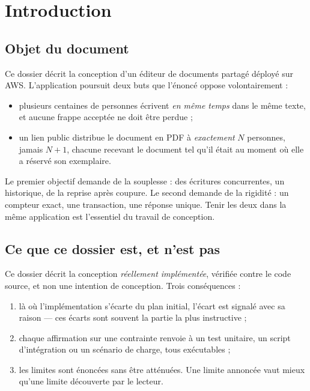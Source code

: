 \section{Introduction}

\subsection{Objet du document}

Ce dossier décrit la conception d'un éditeur de documents partagé déployé sur
AWS. L'application poursuit deux buts que l'énoncé oppose volontairement :

\begin{itemize}[leftmargin=1.4em,itemsep=2pt]
  \item plusieurs centaines de personnes écrivent \emph{en même temps} dans le
        même texte, et aucune frappe acceptée ne doit être perdue ;
  \item un lien public distribue le document en PDF à \emph{exactement} $N$
        personnes, jamais $N+1$, chacune recevant le document tel qu'il était
        au moment où elle a réservé son exemplaire.
\end{itemize}

Le premier objectif demande de la souplesse : des écritures concurrentes, un
historique, de la reprise après coupure. Le second demande de la rigidité : un
compteur exact, une transaction, une réponse unique. Tenir les deux dans la même
application est l'essentiel du travail de conception.

\subsection{Ce que ce dossier est, et n'est pas}

Ce dossier décrit la conception \emph{réellement implémentée}, vérifiée contre
le code source, et non une intention de conception. Trois conséquences :

\begin{enumerate}[leftmargin=1.4em,itemsep=2pt]
  \item là où l'implémentation s'écarte du plan initial, l'écart est signalé avec
        sa raison — ces écarts sont souvent la partie la plus instructive ;
  \item chaque affirmation sur une contrainte renvoie à un test unitaire, un
        script d'intégration ou un scénario de charge, tous exécutables ;
  \item les limites sont énoncées sans être atténuées. Une limite annoncée vaut
        mieux qu'une limite découverte par le lecteur.
\end{enumerate}

